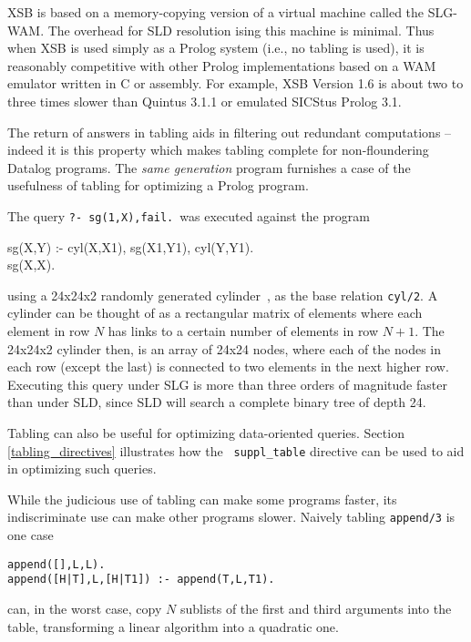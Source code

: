 XSB is based on a memory-copying version of a virtual machine called
the SLG-WAM.  The overhead for SLD resolution ising this machine is
minimal.  Thus when XSB is used simply as a Prolog system (i.e., no
tabling is used), it is reasonably competitive with other Prolog
implementations based on a WAM emulator written in C or assembly.  For
example, XSB Version 1.6 is about two to three times slower than
Quintus 3.1.1 or emulated SICStus Prolog 3.1.

The return of answers in tabling aids in filtering out redundant
computations -- indeed it is this property which makes tabling
complete for non-floundering Datalog programs.  The {\em same
generation} program furnishes a case of the usefulness of tabling for
optimizing a Prolog program.
\begin{example} \label{ex:same-gen} {\rm
The query {\tt ?- sg(1,X),fail.}\ was executed against the program
\begin{center}
\begin{Prog}
    sg(X,Y) :- cyl(X,X1), sg(X1,Y1), cyl(Y,Y1).	\\
    sg(X,X).
\end{Prog}
\end{center}
using a 24x24x2 randomly generated cylinder~\cite{BaRa86}, as the base
relation {\tt cyl/2}.  A cylinder can be thought of as a rectangular
matrix of elements where each element in row $N$ has links to a
certain number of elements in row $N+1$.  The 24x24x2 cylinder then,
is an array of 24x24 nodes, where each of the nodes in each row
(except the last) is connected to two elements in the next higher row.
Executing this query under SLG is more than three orders of magnitude
faster than under SLD, since SLD will search a complete binary tree of
depth 24.  }
\end{example}
Tabling can also be useful for optimizing data-oriented queries.
Section \ref{tabling_directives} illustrates how the {\tt
suppl\_table} directive can be used to aid in optimizing such queries.

While the judicious use of tabling can make some programs faster, its 
indiscriminate use can make other programs slower.  Naively tabling 
{\tt append/3} is one case
\begin{center}
\begin{minipage}{3.5in}
\begin{verbatim}
append([],L,L).
append([H|T],L,[H|T1]) :- append(T,L,T1).
\end{verbatim}						       
\end{minipage}
\end{center}
can, in the worst case, copy $N$ sublists of the first and third
arguments into the table, transforming a linear algorithm into a
quadratic one.

